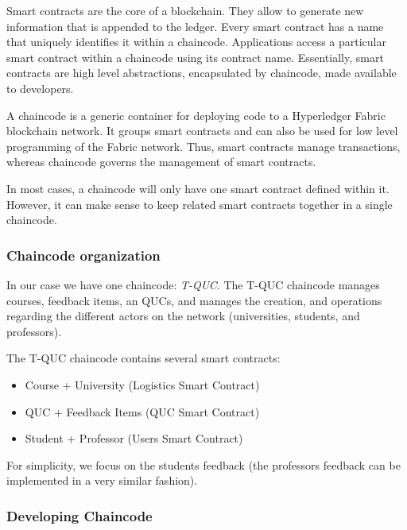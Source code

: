 \documentclass[12pt,a4paper]{article}
\theoremstyle{definition}
\begin{document}
Smart contracts are the core of a blockchain. They allow to generate new information that is appended to the ledger. Every smart contract has a name that uniquely identifies it within a chaincode. Applications access a particular smart contract within a chaincode using its contract name. Essentially, smart contracts are high level abstractions, encapsulated by chaincode, made available to developers. 

A chaincode is a generic container for deploying code to a Hyperledger Fabric blockchain network. It groups smart contracts and can also be used for low level programming of the Fabric network. Thus, smart contracts manage transactions, whereas chaincode governs the management of smart contracts.




In most cases, a chaincode will only have one smart contract defined within it. However, it can make sense to keep related smart contracts together in a single chaincode.

\subsubsection{Chaincode organization}
In our case we have one chaincode: \emph{T-QUC}. The T-QUC chaincode manages courses, feedback items, an QUCs, and manages the creation, and operations regarding the different actors on the network (universities, students, and professors). 

The T-QUC chaincode contains several smart contracts:
\begin{itemize}
    \item Course + University (Logistics Smart Contract)
    \item QUC + Feedback Items (QUC Smart Contract)
        \item Student + Professor (Users Smart Contract)

\end{itemize}

For simplicity, we focus on the students feedback (the professors feedback can be implemented in a very similar fashion).
%

\subsubsection{Developing Chaincode}
\end{document}
